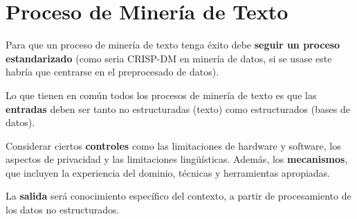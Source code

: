 \documentclass[12pt, twoside, openright]{report} %
\begin{document}
\section{Proceso de Minería de Texto}
Para que un proceso de minería de texto tenga éxito debe \textbf{seguir un proceso estandarizado} (como seria CRISP-DM en minería de datos, si se usase este habría que centrarse en el preprocesado de datos). 

Lo que tienen en común todos los procesos de minería de texto es que las \textbf{entradas} deben ser tanto no estructuradas (texto) como estructurados (bases de datos).

Considerar ciertos \textbf{controles} como las limitaciones de hardware y software, los aspectos de privacidad y las limitaciones lingüísticas. Además, los \textbf{mecanismos}, que incluyen la experiencia del dominio, técnicas y herramientas apropiadas.

La \textbf{salida} será conocimiento específico del contexto, a partir de procesamiento de los datos no estructurados.
\end{document}
